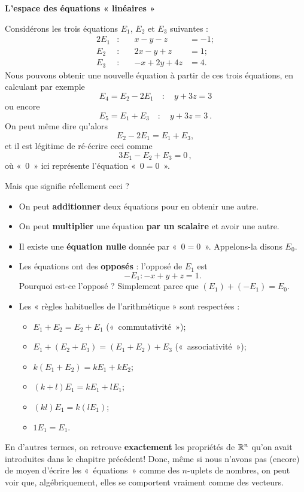\begin{myexample} {\bf L'espace des équations « linéaires »}
\label{exemple : l espace des equation lineaires}

Considérons les trois équations $E_1$, $E_2$ et $E_3$ suivantes :
\begin{alignat*}{2}
E_1 &: \quad  &x-y-z &= -1; \\
E_2 &: \quad &2x-y+z &= 1;\\
E_3 &: \quad &-x+2y+4z &=4.
\end{alignat*}
Nous pouvons obtenir une nouvelle équation à partir de ces trois équations, en calculant par exemple 
$$
E_4 = E_2-2E_1 \quad : \quad y+3z=3
$$
ou encore
$$
E_5=E_1 + E_3 \quad : \quad y+3z = 3\ .
$$
On peut même dire qu'alors 
$$
E_2-2E_1 = E_1 + E_3,
$$
et il est légitime de ré-écrire ceci comme 
$$
3E_1 -E_2 + E_3 = 0\, ,
$$
où «~$0$~» ici représente l'équation «~$0=0$~».

Mais que signifie réellement ceci ?
\begin{itemize}
\item On peut {\bf additionner} deux équations pour en obtenir une autre.
\item On peut {\bf multiplier} une équation {\bf par un scalaire} et avoir
une autre.
\item Il existe une {\bf équation nulle} donnée par «~$0=0$~».  Appelons-la disons
$E_0$.
\item Les équations ont des {\bf opposés} : l'opposé de $E_1$ est 
$$
-E_1 : -x+y+z=1.
$$
Pourquoi est-ce l'opposé ?  Simplement parce que $(E_1) + (-E_1) = E_0$.
\item Les « règles habituelles de l'arithmétique » sont respectées :
\begin{itemize}
\item $E_1 + E_2 = E_2+E_1$ («~commutativité~»);
\item $E_1 + (E_2+E_3) = (E_1 + E_2) + E_3$ («~associativité~»);
\item $k(E_1+E_2) = kE_1+kE_2$;
\item $(k+l)E_1 = kE_1 + lE_1$;
\item $(kl)E_1 = k(lE_1)$;
\item $1 E_1 = E_1$.
\end{itemize}
\end{itemize}


En d'autres termes, on retrouve {\bf exactement} les propriétés de $\mathbb{R}^n$ qu'on avait introduites dans le chapitre précédent!  
Donc, même si nous n'avons pas (encore) de moyen d'écrire les «~équations~» comme des $n$-uplets de nombres,
on peut voir que, algébriquement, elles se comportent vraiment comme des vecteurs.
\end{myexample}




